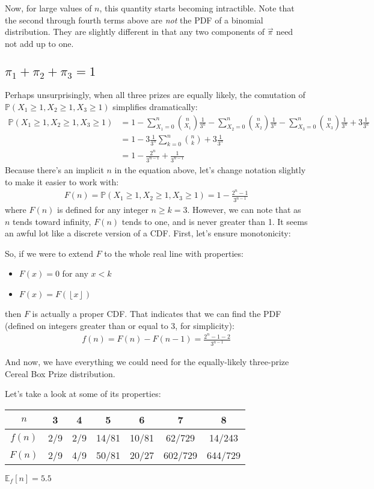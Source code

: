 \documentclass{article}
\newcommand{\prob}{ \ensuremath{ \mathbb{P} }}
\newcommand{\floor}[1]{ \ensuremath{ \left \lfloor{#1}\right \rfloor  } }
\begin{document}
Now, for large values of $n$, this quantity starts becoming intractible. Note that the second through fourth terms
above are \emph{not} the PDF of a binomial distribution. They are slightly different in that any two components
of $\vec{\pi}$ need not add up to one.

\subsection{$\pi_1+\pi_2+\pi_3=1$}
Perhaps unsurprisingly, when all three prizes are equally likely, the comutation of
$\prob(X_1\geq1, X_2\geq1,X_3\geq1)$ simplifies dramatically:
\begin{align*}
\prob(X_1\geq1, X_2\geq1,X_3\geq1)&=
1-\sum_{X_1=0}^n\binom{n}{X_1}\frac{1}{3^n}
-\sum_{X_2=0}^n\binom{n}{X_2}\frac{1}{3^n}
-\sum_{X_3=0}^n\binom{n}{X_3}\frac{1}{3^n}
+ 3\frac{1}{3^n}
\\
&=1-3\frac{1}{3^n}\sum_{k=0}^n\binom{n}{k}+3\frac{1}{3^n}
\\
&=1-\frac{2^n}{3^{n-1}}+\frac{1}{3^{n-1}}
\end{align*}
Because there's an implicit $n$ in the equation above, let's change notation slightly to make it easier to work with:
\begin{align*}
F(n)=\prob(X_1\geq1, X_2\geq1,X_3\geq1)=1-\frac{2^n-1}{3^{n-1}}
\end{align*}
where $F(n)$ is defined for any integer $n\geq k=3$. However, we can note that as $n$ tends toward infinity,
$F(n)$ tends to one, and is never greater than 1. It seems an awful lot like a discrete version of a CDF. First,
let's ensure monotonicity:


So, if we were to extend $F$ to the whole real line with properties:
\begin{itemize}
\item $F(x)=0$ for any $x<k$
\item $F(x)=F(\floor{x})$
\end{itemize}
then $F$ is actually a proper CDF. That indicates that we can find the PDF (defined on integers greater than or
equal to 3, for simplicity):
\begin{align*}
f(n)=F(n)-F(n-1)=\frac{2^n-1-2}{3^{n-1}}
\end{align*}

And now, we have everything we could need for the equally-likely three-prize Cereal Box Prize distribution.

Let's take a look at some of its properties:

\begin{tabular}{c|c|c|c|c|c|c}
$n$ & 3 & 4 & 5 & 6 & 7 & 8 \\
\hline
$f(n)$ & 2/9 & 2/9 & 14/81 & 10/81 & 62/729 & 14/243\\
$F(n)$ & 2/9 & 4/9 & 50/81 & 20/27 & 602/729 & 644/729
\end{tabular}

$\mathbb{E}_f[n]=5.5$


%
%

\end{document}
